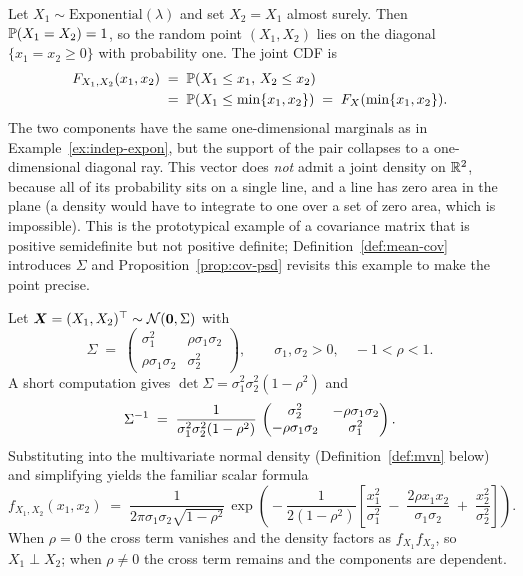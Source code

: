 \begin{example}[Maximally dependent: \(X_1 = X_2\) a.s.]\label{ex:max-dependent}
Let \(X_1 \sim \mathrm{Exponential}(\lambda)\) and set \(X_2 = X_1\) almost surely. Then \(\mathbb{P}(X_1 = X_2) = 1\), so the random point \((X_1, X_2)\) lies on the diagonal \(\{x_1 = x_2 \ge 0\}\) with probability one. The joint CDF is
\begin{align*}
  F_{X_1, X_2}(x_1, x_2)
  &\;=\; \mathbb{P}(X_1 \le x_1,\, X_2 \le x_2) \\
  &\;=\; \mathbb{P}(X_1 \le \min\{x_1, x_2\})
  \;=\; F_X(\min\{x_1, x_2\}).
\end{align*}
The two components have the same one-dimensional marginals as in Example~\ref{ex:indep-expon}, but the support of the pair collapses to a one-dimensional diagonal ray. This vector does \emph{not} admit a joint density on \(\mathbb{R}^2\), because all of its probability sits on a single line, and a line has zero area in the plane (a density would have to integrate to one over a set of zero area, which is impossible). This is the prototypical example of a covariance matrix that is positive semidefinite but not positive definite; Definition~\ref{def:mean-cov} introduces \(\Sigma\) and Proposition~\ref{prop:cov-psd} revisits this example to make the point precise.
\end{example}

\begin{example}\label{ex:bvn-density}
Let \(\bm{X} = (X_1, X_2)^{\top} \sim \mathcal{N}(\bm{0}, \Sigma)\) with
\[
  \Sigma \;=\; \begin{pmatrix} \sigma_1^2 & \rho \sigma_1 \sigma_2 \\ \rho \sigma_1 \sigma_2 & \sigma_2^2 \end{pmatrix}, \qquad \sigma_1, \sigma_2 > 0,\quad -1 < \rho < 1.
\]
A short computation gives \(\det \Sigma = \sigma_1^2 \sigma_2^2 (1 - \rho^2)\) and
\[
  \Sigma^{-1} \;=\; \frac{1}{\sigma_1^2 \sigma_2^2 (1 - \rho^2)}\, \begin{pmatrix} \sigma_2^2 & -\rho \sigma_1 \sigma_2 \\ -\rho \sigma_1 \sigma_2 & \sigma_1^2 \end{pmatrix}.
\]
Substituting into the multivariate normal density (Definition~\ref{def:mvn} below) and simplifying yields the familiar scalar formula
\[
  f_{X_1, X_2}(x_1, x_2) \;=\; \frac{1}{2 \pi \sigma_1 \sigma_2 \sqrt{1 - \rho^2}}\, \exp\!\left(\!-\frac{1}{2 (1 - \rho^2)}\!\left[\frac{x_1^2}{\sigma_1^2} \;-\; \frac{2 \rho x_1 x_2}{\sigma_1 \sigma_2} \;+\; \frac{x_2^2}{\sigma_2^2}\right]\right).
\]
When \(\rho = 0\) the cross term vanishes and the density factors as \(f_{X_1} f_{X_2}\), so \(X_1 \perp X_2\); when \(\rho \ne 0\) the cross term remains and the components are dependent.
\end{example}

